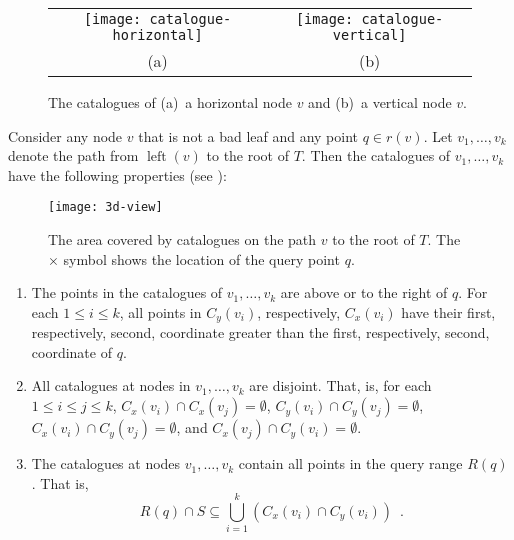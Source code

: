 \documentclass[lotsofwhite,charterfonts]{patmorin}
\DeclareMathOperator{\lft}{left}
\begin{document}
\begin{figure}
  \begin{center}
    \begin{tabular}{c|c}
      \texttt{[image: catalogue-horizontal]} &
        \texttt{[image: catalogue-vertical]} \\
       (a) & (b) 
    \end{tabular}
  \end{center}
  \caption{The catalogues of (a)~a horizontal node $v$ and (b)~a
  vertical node $v$.}
\end{figure}

Consider any node $v$ that is not a bad leaf and any point $q\in
r(v)$.  Let $v_1,\ldots,v_k$ denote the path from $\lft(v)$ to the
root of $T$.  Then the catalogues of $v_1,\ldots,v_k$ have the
following properties (see ):
\begin{figure}
  \begin{center}
    \texttt{[image: 3d-view]}
  \end{center}
  \caption{The area covered by catalogues on the path $v$ to the root
of $T$. The $\times$ symbol shows the location of the query point $q$.}
\end{figure}

\begin{enumerate}
\item The points in the catalogues of $v_1,\ldots,v_k$ are above
or to the right of $q$.  For each $1\le i \le k$, all points in $C_y(v_i)$, respectively,
$C_x(v_i)$ have their first, respectively, second, coordinate greater
than the first, respectively, second, coordinate of $q$.

\item All catalogues at nodes in $v_1,\ldots,v_k$ are disjoint.  That,
is, for each $1\le i\le j \le k$,
$C_x(v_i)\cap C_x(v_j) = \emptyset$,
$C_y(v_i)\cap C_y(v_j) = \emptyset$,
$C_x(v_i)\cap C_y(v_j) = \emptyset$, and
$C_x(v_j)\cap C_y(v_i) = \emptyset$.

\item The catalogues at nodes $v_1,\ldots,v_k$ contain all points in
the query range $R(q)$.  That is,
\[
     R(q)\cap S \subseteq \bigcup_{i=1}^k \left(C_x(v_i)\cap C_y(v_i)\right)
        \enspace . 
\]
\end{enumerate}

%
\end{document}
